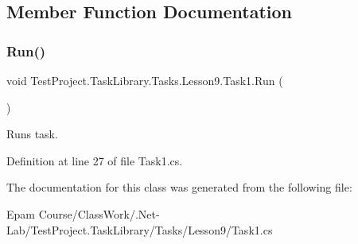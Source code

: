 \subsection{Member Function Documentation}
\mbox{\label{class_test_project_1_1_task_library_1_1_tasks_1_1_lesson9_1_1_task1_a9cd2b81018cab0a02a0f89a99e6d0dd1}} 
\subsubsection{\texorpdfstring{Run()}{Run()}}
{\footnotesize\ttfamily void Test\+Project.\+Task\+Library.\+Tasks.\+Lesson9.\+Task1.\+Run (\begin{DoxyParamCaption}{ }\end{DoxyParamCaption})}



Runs task. 



Definition at line 27 of file Task1.\+cs.



The documentation for this class was generated from the following file\+:\begin{DoxyCompactItemize}
\item 
Epam Course/\+Class\+Work/.\+Net-\/\+Lab/\+Test\+Project.\+Task\+Library/\+Tasks/\+Lesson9/Task1.\+cs\end{DoxyCompactItemize}
